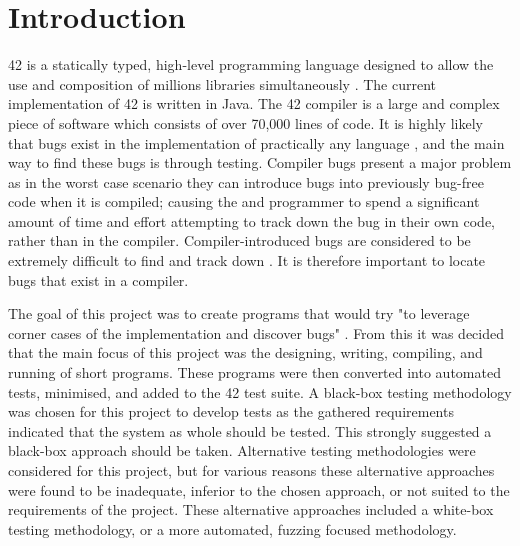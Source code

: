 \chapter{Introduction}\label{C:intro}

\makeatletter
\renewcommand{\@chapapp}{}%
\newenvironment{chapquote}[2][2em]
  {\setlength{\@tempdima}{#1}%
   \def\chapquote@author{#2}%
   \parshape 1 \@tempdima \dimexpr\textwidth-2\@tempdima\relax%
   \itshape}
  {\par\normalfont\hfill--\ \chapquote@author\hspace*{\@tempdima}\par\bigskip}
\makeatother

42 is a statically typed, high-level programming language designed to allow the use and composition of millions libraries simultaneously \cite{L42}. The current implementation of 42 is written in Java. The 42 compiler is a large and complex piece of software which consists of over 70,000 lines of code. It is highly likely that bugs exist in the implementation of practically any language \cite{arnabold}, and the main way to find these bugs is through testing. Compiler bugs present a major problem as in the worst case scenario they can introduce bugs into previously bug-free code when it is compiled; causing the and programmer to spend a significant amount of time and effort attempting to track down the bug in their own code, rather than in the compiler. Compiler-introduced bugs are considered to be extremely difficult to find and track down \cite{Leroy:2009}. It is therefore important to locate bugs that exist in a compiler.

The goal of this project was to create programs that would try "to leverage corner cases of the implementation and discover bugs" \cite{outline}. From this it was decided that the main focus of this project was the designing, writing, compiling, and running of short programs. These programs were then converted into automated tests, minimised, and added to the 42 test suite. A black-box testing methodology \cite{ostrand} was chosen for this project to develop tests as the gathered requirements indicated that the system as whole should be tested. This strongly suggested a black-box approach should be taken. Alternative testing methodologies were considered for this project, but for various reasons these alternative approaches were found to be inadequate, inferior to the chosen approach, or not suited to the requirements of the project. These alternative approaches included a white-box testing methodology, or a more automated, fuzzing focused methodology.
 

